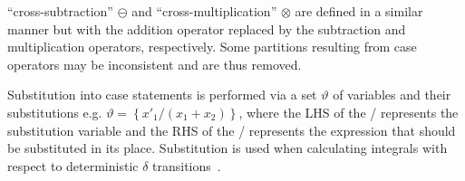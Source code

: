 ``cross-subtraction'' {\footnotesize$\ominus$} and ``cross-multiplication'' {\footnotesize$\otimes$} are defined in a similar manner but with the addition operator replaced by the subtraction and multiplication operators, respectively. Some partitions resulting from case operators may be inconsistent and are thus removed.

Substitution into case statements is performed via a set {\footnotesize$\vartheta$} of variables and their substitutions e.g. {\footnotesize$\vartheta = \left\{ x'_1/(x_1 + x_2) \right\}$}, where the LHS of the / represents the substitution variable and the RHS of the / represents the expression that should be substituted in its place. 
Substitution is used when calculating integrals with respect to deterministic {\footnotesize$\delta$} transitions~\parencite{Sanner_UAI_2011}.

